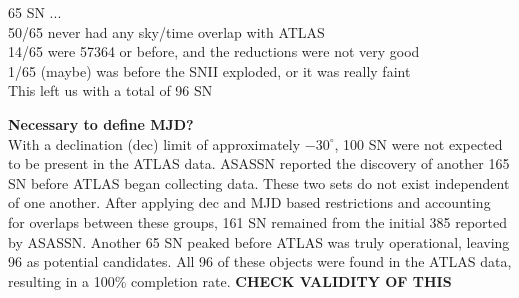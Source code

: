 \documentclass[aps,prb,twocolumn,superscriptaddress]{revtex4-1}
\begin{document}
 65 SN ...\\
 50/65 never had any sky/time overlap with ATLAS\\
 14/65 were 57364 or before, and the reductions were not very good\\
 1/65 (maybe) was before the SNII exploded, or it was really faint\\
 This left us with a total of 96 SN
\fi


{\bf Necessary to define MJD?}\\

\indent With a declination (dec) limit of approximately $-30^{\circ}$, 100 SN were not 
expected to be present in the ATLAS data.
ASASSN reported the discovery of another 165 SN before ATLAS began collecting data. 
These two sets do not exist independent of one another. 
After applying dec and MJD based restrictions and accounting for overlaps between 
these groups, 161 SN remained from the initial 385 reported by ASASSN. 
Another 65 SN peaked before ATLAS was truly operational, leaving 96 as potential candidates.
All 96 of these objects were found in the ATLAS data, resulting in a 100\% completion rate.
{\bf CHECK VALIDITY OF THIS}
\end{document}
